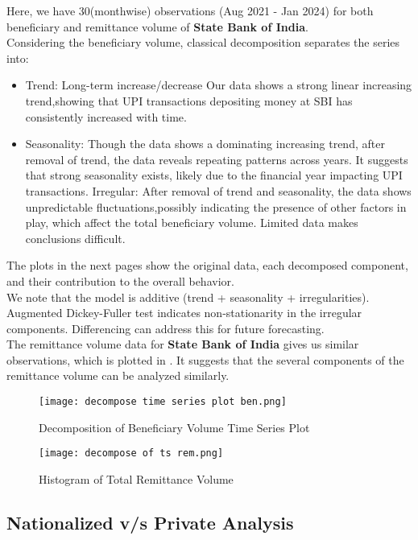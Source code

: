 \documentclass{article}
\begin{document}
Here, we have 30(monthwise) observations (Aug 2021 - Jan 2024) for both beneficiary and remittance volume of \textbf{State Bank of India}.
\\
Considering the beneficiary volume,
classical decomposition separates the series into:
\begin{itemize}
    \item Trend: Long-term increase/decrease
Our data shows a strong linear increasing trend,showing that UPI transactions depositing money at SBI has consistently increased with time.
\item Seasonality: Though the data shows a dominating increasing trend, after removal of trend, the data reveals repeating patterns across years.
It suggests that strong seasonality exists, likely due to the financial year impacting UPI transactions.
Irregular: After removal of trend and seasonality, the data shows unpredictable fluctuations,possibly indicating the presence of other factors in play, which affect the total beneficiary volume.
Limited data makes conclusions difficult.
\end{itemize}
The plots in the next pages show the original data, each decomposed component, and their contribution to the overall behavior.\\
We note that the model is additive (trend + seasonality + irregularities). Augmented Dickey-Fuller test indicates non-stationarity in the irregular components. Differencing can address this for future forecasting.\\
The remittance volume data for \textbf{State Bank of India} gives us similar observations, which is plotted in . It suggests that the several components of the remittance volume can be analyzed similarly.

\begin{figure}[H]
    \centering
    \texttt{[image: decompose time series plot ben.png]}
    \caption{Decomposition of Beneficiary Volume Time Series Plot}
    \label{fig:example}
\end{figure}

\begin{figure}[H]
    \centering
    \texttt{[image: decompose of ts rem.png]}
    \caption{Histogram of Total Remittance Volume}
    \label{fig:example}
\end{figure}






\subsection{Nationalized v/s Private Analysis}
\end{document}
